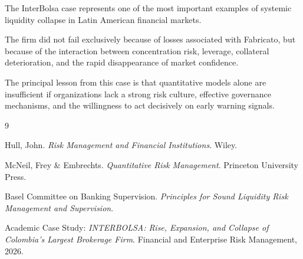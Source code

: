 The InterBolsa case represents one of the most important examples of systemic liquidity collapse in Latin American financial markets.

The firm did not fail exclusively because of losses associated with Fabricato, but because of the interaction between concentration risk, leverage, collateral deterioration, and the rapid disappearance of market confidence.

The principal lesson from this case is that quantitative models alone are insufficient if organizations lack a strong risk culture, effective governance mechanisms, and the willingness to act decisively on early warning signals.

\vspace{0.5cm}



\begin{thebibliography}{9}

Hull, John.
\textit{Risk Management and Financial Institutions}.
Wiley.

McNeil, Frey \& Embrechts.
\textit{Quantitative Risk Management}.
Princeton University Press.

Basel Committee on Banking Supervision.
\textit{Principles for Sound Liquidity Risk Management and Supervision}.

Academic Case Study:
\textit{INTERBOLSA: Rise, Expansion, and Collapse of Colombia's Largest Brokerage Firm}.
Financial and Enterprise Risk Management, 2026.

\end{thebibliography}
